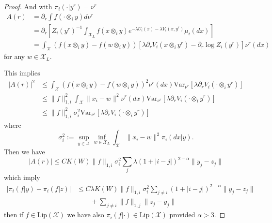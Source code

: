 \documentclass[a4paper,12pt,reqno]{amsart}
\newcommand{\X}{\mathcal{X}}
\begin{document}
\begin{proof}
And with $\pi_i(\cdot|y^r) = \nu^r$
\begin{equation}
  \begin{split}
A(r) & = \partial_r \int f(\cdot \otimes_i y) d\nu^r 
\\ &= \partial_r \left[Z_i(y^r)^{-1} \int_{\X_L}
  f(x \otimes_i y) e^{-\lambda U_i(x) -\lambda V_i(x,y^r)} \mu_i(dx)
  \right]
\\ &=  \int_{\X} (f(x\otimes_i y)-f(w \otimes_i y)) \left[ \lambda \partial_r
  V_i(x\otimes_i y^r) - \partial_r \log Z_i(y^r) \right] \nu^r(dx) 
  \end{split}
\end{equation}
for any $w \in \X_L$.

This implies
\begin{equation*}
  \begin{split}
|A(r)|^2 & \le  \int_{\X} (f(x\otimes_i y)-f(w \otimes_i y))^2  \nu^r(dx)
 \text{Var}_{\nu^r}\left[  \lambda \partial_r
  V_i(\cdot \otimes_i y^r )\right]
\\ & \le   \|f\|_{1,i}^2  \int_{\X} \|x_i-w\|^2  \nu^r(dx)
 \text{Var}_{\nu^r}\left[  \lambda \partial_r
  V_i(\cdot \otimes_i y^r )\right]   
\\ & \le   \|f\|_{1,i}^2  \sigma_i^2 
 \text{Var}_{\nu^r}\left[  \lambda \partial_r
  V_i(\cdot \otimes_i y^r )\right]   
  \end{split}
\end{equation*}
where
$$
\sigma_i^2 := \sup_{y\in\X} \inf_{w \in \X_L} \int_{\X} \|x_i-w\|^2  
\pi_i(dx|y).
$$
Then we have
\begin{equation*}
  \left|A(r) \right| \le C K(W) \|f\|_{1,i}  \sigma_i^2 \sum_j
  \lambda (1+|i-j|)^{2-\alpha}  \|y_j-z_j\|
\end{equation*}
which imply
\begin{equation*}
  \begin{split}
 \left|\pi_i(f|y)-\pi_i(f|z)\right| & \le 
 C \lambda K(W) \|f\|_{1,i}  \sigma_i^2 
  \sum_{j \neq i} (1+|i-j|)^{2-\alpha}  \|y_j-z_j\| 
\\ & \qquad + 
 \sum_{j\neq i} \|f\|_{1,j} \|z_j-y_j\| 
  \end{split}
\end{equation*}
then if $f \in \text{Lip}(\X)$ we have also $\pi_i(f|\cdot) \in
\text{Lip}(\X)$ provided $\alpha > 3$.


\end{proof}
\end{document}
